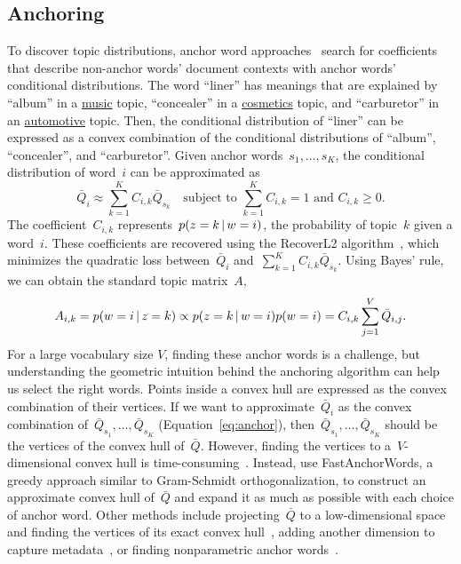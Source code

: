 \subsection{Anchoring}
\label{sec:anchoring}
To discover topic distributions, anchor word approaches~\citep{arora-2013} search for coefficients that describe non-anchor words' document contexts with anchor words' conditional distributions.  The word ``liner'' has meanings that are explained by ``album'' in a \underline{music} topic, ``concealer'' in a \underline{cosmetics} topic, and ``carburetor'' in an \underline{automotive} topic.  Then, the conditional distribution
of ``liner'' can be expressed as a convex combination of the
conditional distributions of ``album'', ``concealer'', and
``carburetor''.  Given anchor words~$s_1,\dots,s_K$, the conditional
distribution of word~$i$ can be approximated as 
\begin{equation}
 \label{eq:anchor} 
\bar{Q}_{i} \approx \sum \limits_{k=1}^{K}
C_{i,k} \bar{Q}_{s_k} \quad \mbox{subject to } \sum\limits_{k=1}^K
C_{i,k} = 1 \mbox{ and } C_{i,k} \ge 0.  
\end{equation} 
The coefficient~$C_{i,k}$ represents~$p(z=k \, | \, w=i)$, the probability
of topic~$k$ given a word~$i$.  These coefficients are recovered using
the RecoverL2 algorithm~\citep{arora-2013}, which minimizes the quadratic loss between~\(\bar{Q}_{i}\) and~\( \sum_{k=1}^K C_{i,k} \bar{Q}_{s_k}\). Using Bayes' rule,
we can obtain the standard topic matrix~$A$,
\begin{equation}
\label{eq:topic} 
A_{i,k} =
p(w=i \, | \, z=k) \propto p(z=k \, | \, w=i) p(w=i) =
C_{i,k} \sum\limits_{j=1}^V \bar{Q}_{i,j}. 
\end{equation}
For a large vocabulary size $V$, finding these anchor words is a challenge,
but understanding the geometric intuition behind the anchoring
algorithm can help us select the right words.  Points inside a convex hull
are expressed as the convex combination of their vertices. If we want
to approximate~$\bar{Q}_{i}$ as the convex combination
of~$\bar{Q}_{s_1},\dots,\bar{Q}_{s_K}$ (Equation~\ref{eq:anchor}),
then~$\bar{Q}_{s_1},\dots,\bar{Q}_{s_K}$ should be the vertices of the
convex hull of~$\bar{Q}$.  However, finding the vertices to
a~$V$-dimensional convex hull is time-consuming~\citep{arora-2012-anchor}.
Instead,  use FastAnchorWords, a
greedy approach similar to Gram-Schmidt orthogonalization, to
construct an approximate convex hull of~$\bar{Q}$ and expand it as
much as possible with each choice of anchor word.  Other methods
include projecting~$\bar{Q}$ to a low-dimensional space and finding
the vertices of its exact convex hull~\citep{lee-14}, adding another dimension to capture metadata~\citep{nguyen-2015}, or finding
nonparametric anchor words~\citep{yurochkin-2017}.








